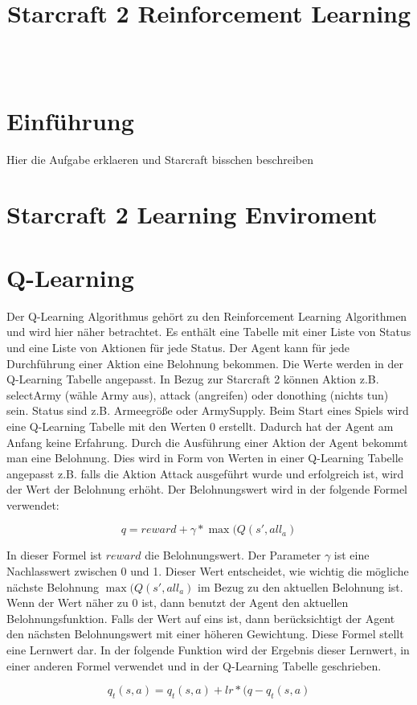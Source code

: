 \documentclass{IEEEtran}
\title{Starcraft 2 Reinforcement Learning}
\author{\IEEEauthorblockN{Ibrahim Cinar, Tobias Grasmeyer, Artur Schmidt} \\
\IEEEauthorblockA{Fachbereich Informatik\\
Hochschule Darmstadt}
}
\begin{document}
\maketitle
\section{Einführung}
Hier die Aufgabe erklaeren und Starcraft bisschen beschreiben
\section{Starcraft 2 Learning Enviroment}

\section{Q-Learning}
Der Q-Learning Algorithmus gehört zu den Reinforcement Learning Algorithmen und wird hier näher betrachtet. Es enthält eine Tabelle mit einer Liste von Status und eine Liste von Aktionen für jede Status. Der Agent kann für jede  Durchführung einer Aktion eine Belohnung bekommen. Die Werte werden in der Q-Learning Tabelle angepasst. In Bezug zur Starcraft 2 können Aktion z.B. selectArmy (wähle Army aus), attack (angreifen) oder donothing (nichts tun) sein. Status sind z.B. Armeegröße oder ArmySupply.
Beim Start eines Spiels wird eine Q-Learning Tabelle mit den Werten 0 erstellt. Dadurch hat der Agent am Anfang keine Erfahrung. 
Durch die Ausführung einer Aktion der Agent bekommt man eine Belohnung. Dies wird in Form von Werten in einer Q-Learning Tabelle angepasst z.B. falls die Aktion Attack ausgeführt wurde und erfolgreich ist, wird der Wert der Belohnung erhöht. Der Belohnungswert wird in der folgende Formel verwendet:

\[q = reward + \gamma * \max(Q(s',all_a) \]

In dieser Formel ist $reward$ die Belohnungswert. Der Parameter $\gamma$ ist eine Nachlasswert zwischen 0 und 1. Dieser Wert entscheidet, wie wichtig die mögliche nächste Belohnung $\max(Q(s',all_a)$ im Bezug zu den aktuellen Belohnung ist. Wenn der Wert näher zu 0 ist, dann benutzt der Agent den aktuellen Belohnungsfunktion. Falls der Wert auf eins ist, dann  berücksichtigt der Agent den nächsten Belohnungswert mit einer höheren Gewichtung. Diese Formel stellt eine Lernwert dar.
In der folgende Funktion wird der Ergebnis dieser Lernwert, in einer anderen Formel verwendet und in der Q-Learning Tabelle geschrieben.

\[q_t(s, a)= q_t(s, a)+ lr * (q - q_t(s,a) \]
\end{document}
